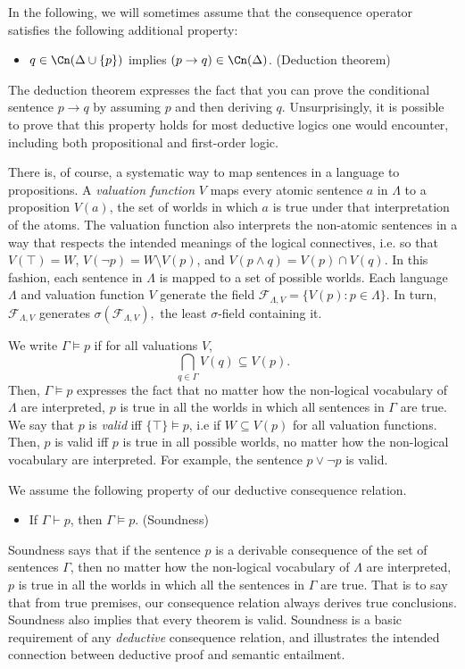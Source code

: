 In the following, we will sometimes assume that the consequence operator
satisfies the following additional property:
\begin{itemize}
\item[] $q\in \Cn(\Delta \cup \{p\})$ implies $(p\rightarrow q)\in\Cn(\Delta)$.
\hfill (Deduction theorem)
\end{itemize}
The deduction theorem expresses the fact that you can prove the conditional
sentence $p\rightarrow q$ by assuming $p$ and then deriving $q$. Unsurprisingly,
it is possible to prove that this property holds for most deductive logics one
would encounter, including both propositional and first-order logic.

There is, of course, a systematic way to map sentences in a language to
propositions. A {\em valuation function} $V$  maps every atomic sentence $a$ in
$\Lambda$ to a proposition $V(a)$,  the set of worlds in which $a$ is true under
that interpretation of the atoms. The valuation function also interprets the
non-atomic sentences in a way that respects the intended meanings of the logical
connectives, i.e. so that $V(\top)=W$, $V(\neg p)=W\setminus V(p)$, and
$V(p\wedge q)= V(p)\cap V(q).$ In this fashion, each sentence in $\Lambda$ is
mapped to a set of possible worlds. Each language $\Lambda$ and valuation
function $V$ generate the field $\mathcal{F}_{\Lambda,V} =\{ V(p) : p \in
\Lambda \}.$ In turn, $\mathcal{F}_{\Lambda,V}$ generates
$\sigma(\mathcal{F}_{\Lambda,V}),$ the least $\sigma$-field containing it.

We write $\Gamma \vDash p$ if for all valuations $V$, $$\bigcap_{q \in \Gamma}
V(q) \subseteq V(p).$$ Then, $ \Gamma \vDash p$ expresses the fact that no
matter how the non-logical vocabulary of $\Lambda$ are interpreted, $p$ is true
in all the worlds in which all sentences in $\Gamma$ are true. We say that $p$
is {\em valid} iff $\{ \top \} \vDash p$, i.e if $W\subseteq V(p)$ for all
valuation functions. Then, $p$ is valid iff $p$ is true in all possible worlds,
no matter how the non-logical vocabulary are interpreted. For example, the
sentence $p\vee \neg p$ is valid.

We assume the following property of our deductive consequence relation.
\begin{itemize}
\item[] If $\Gamma \vdash p$, then $\Gamma \vDash p$. \hfill(Soundness)
\end{itemize}
{Soundness} says that if the sentence $p$ is a derivable consequence of the set
of sentences $\Gamma$, then no matter how the non-logical vocabulary of
$\Lambda$ are interpreted, $p$ is true in all  the worlds in which all the
sentences in $\Gamma$ are true. That is to say that from true premises, our
consequence relation always derives true conclusions.  {Soundness} also implies
that every theorem is valid.  {Soundness} is a basic requirement of any {\em
deductive} consequence relation, and illustrates the intended connection between
deductive proof and semantic entailment.

